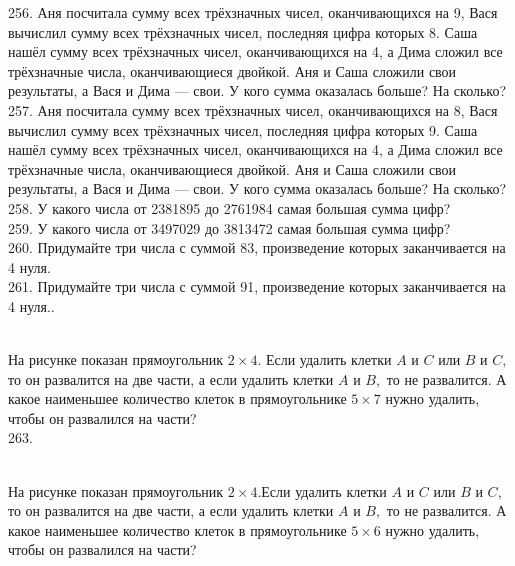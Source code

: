 \documentclass[12pt]{article}
\begin{document}
256. Аня посчитала сумму всех трёхзначных чисел, оканчивающихся на 9, Вася вычислил сумму всех трёхзначных чисел, последняя цифра которых 8. Саша нашёл сумму всех трёхзначных чисел, оканчивающихся на 4, а Дима сложил все трёхзначные числа, оканчивающиеся двойкой. Аня и Саша сложили свои результаты, а Вася и Дима --- свои. У кого сумма оказалась больше? На сколько?\\
257. Аня посчитала сумму всех трёхзначных чисел, оканчивающихся на 8, Вася вычислил сумму всех трёхзначных чисел, последняя цифра которых 9. Саша нашёл сумму всех трёхзначных чисел, оканчивающихся на 4, а Дима сложил все трёхзначные числа, оканчивающиеся двойкой. Аня и Саша сложили свои результаты, а Вася и Дима --- свои. У кого сумма оказалась больше? На сколько?\\
258. У какого числа от 2381895 до 2761984 самая большая сумма цифр?\\
259. У какого числа от 3497029 до 3813472 самая большая сумма цифр?\\
260. Придумайте три числа с суммой 83, произведение которых заканчивается на 4 нуля.\\
261. Придумайте три числа с суммой 91, произведение которых заканчивается на 4 нуля.\newpage{}. \begin{figure}[ht!]
\end{figure}\\
На рисунке показан прямоугольник $2\times4.$ Если удалить клетки $A$ и $C$ или $B$ и $C,$ то он развалится на две части, а если удалить клетки $A$ и $B,$ то не развалится. А какое наименьшее количество клеток в прямоугольнике $5\times7$ нужно удалить, чтобы он развалился на части?\\
263. \begin{figure}[ht!]
\end{figure}\\
На рисунке показан прямоугольник $2\times4.$Если удалить клетки $A$ и $C$ или $B$ и $C,$ то он развалится на две части, а если удалить клетки $A$ и $B,$ то не развалится. А какое наименьшее количество клеток в прямоугольнике $5\times6$ нужно удалить, чтобы он развалился на части?\\
\end{document}
